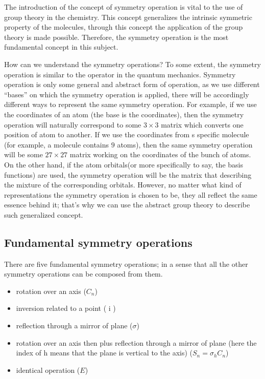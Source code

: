 The introduction of the concept of symmetry operation is vital to the
use of group theory in the chemistry. This concept generalizes the
intrinsic symmetric property of the molecules, through this concept
the application of the group theory is made possible.  Therefore, the
symmetry operation is the most fundamental concept in this subject.

How can we understand the symmetry operations? To some extent, the
symmetry operation is similar to the operator in the quantum
mechanics. Symmetry operation is only some general and abstract form
of operation, as we use different ``bases'' on which the symmetry
operation is applied, there will be accordingly different ways to
represent the same symmetry operation. For example, if we use the
coordinates of an atom (the base is the coordinates), then the
symmetry operation will naturally correspond to some $3\times 3$
matrix which converts one position of atom to another. If we use the
coordinates from s specific molecule (for example, a molecule contains
$9$ atoms), then the same symmetry operation will be some $27\times
27$ matrix working on the coordinates of the bunch of atoms. On the
other hand, if the atom orbitals(or more specifically to say, the
basis functions) are used, the symmetry operation will be the matrix
that describing the mixture of the corresponding orbitals. However, no
matter what kind of representations the symmetry operation is chosen
to be, they all reflect the same essence behind it; that's why we can
use the abstract group theory to describe such generalized concept.


\subsection{Fundamental symmetry operations}
%
%

There are five fundamental symmetry operations; in a sense that all
the other symmetry operations can be composed from them.
\begin{itemize}
\item rotation over an axis ($C_{n}$)
\item inversion related to a point ( i )
\item reflection through a mirror of plane ($\sigma$)
\item rotation over an axis then plus reflection through a mirror of
  plane (here the index of h means that the plane is vertical to the
  axis) ($S_{n} = \sigma_{h} C_{n}$)
\item identical operation ($E$)
\end{itemize}

